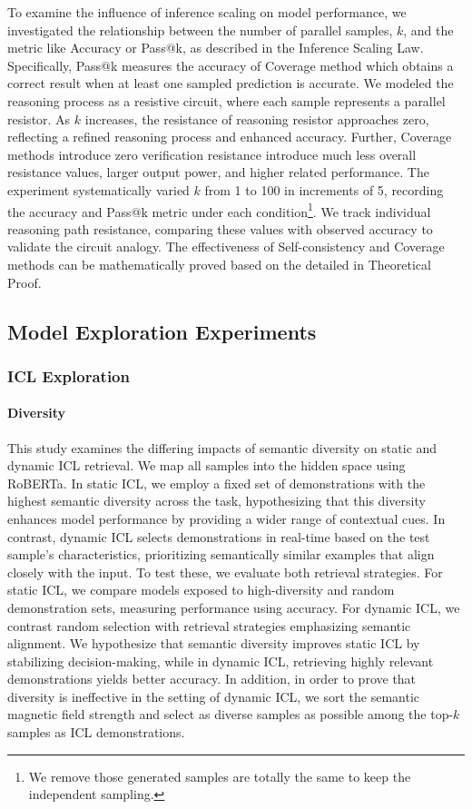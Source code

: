To examine the influence of inference scaling on model performance, we investigated the relationship between the number of parallel samples, \( k \), and the metric like Accuracy or Pass@k, as described in the Inference Scaling Law. Specifically, Pass@k measures the accuracy of Coverage method which obtains a correct result when at least one sampled prediction is accurate. We modeled the reasoning process as a resistive circuit, where each sample represents a parallel resistor. As \( k \) increases, the resistance of reasoning resistor approaches zero, reflecting a refined reasoning process and enhanced accuracy. Further, Coverage methods introduce zero verification resistance introduce much less overall resistance values, larger output power, and higher related performance. The experiment systematically varied \( k \) from 1 to 100 in increments of 5, recording the accuracy and Pass@k metric under each condition\footnote{We remove those generated samples are totally the same to keep the independent sampling.}. We track individual reasoning path resistance, comparing these values with observed accuracy to validate the circuit analogy. The effectiveness of Self-consistency and Coverage methods can be mathematically proved based on the \modelname{} detailed in Theoretical Proof.
\subsection{Model Exploration Experiments}

\subsubsection{ICL Exploration}
\paragraph{Diversity}
This study examines the differing impacts of semantic diversity on static and dynamic ICL retrieval. We map all samples into the hidden space using RoBERTa. In static ICL, we employ a fixed set of demonstrations with the highest semantic diversity across the task, hypothesizing that this diversity enhances model performance by providing a wider range of contextual cues. In contrast, dynamic ICL selects demonstrations in real-time based on the test sample’s characteristics, prioritizing semantically similar examples that align closely with the input.
To test these, we evaluate both retrieval strategies. For static ICL, we compare models exposed to high-diversity and random demonstration sets, measuring performance using accuracy. For dynamic ICL, we contrast random selection with retrieval strategies emphasizing semantic alignment. We hypothesize that semantic diversity improves static ICL by stabilizing decision-making, while in dynamic ICL, retrieving highly relevant demonstrations yields better accuracy. In addition, in order to prove that diversity is ineffective in the setting of dynamic ICL, we sort the semantic magnetic field strength and select as diverse samples as possible among the top-$k$ samples as ICL demonstrations.


